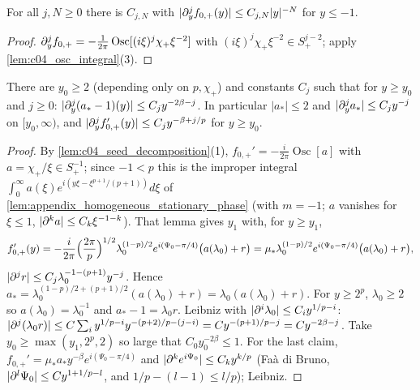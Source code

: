 \begin{lemma}
  \label{lem:c04_f0plus_negative}
  For all $j,N\ge0$ there is $C_{j,N}$ with $|\partial_y^jf_{0,+}(y)|\le C_{j,N}|y|^{-N}$ for $y\le-1$.
\end{lemma}
\begin{proof}
  $\partial^j_yf_{0,+}=-\frac1{2\pi}\operatorname{Osc}[(i\xi)^j\chi_+\xi^{-2}]$ with $(i\xi)^j\chi_+\xi^{-2}\in S^{j-2}_+$; apply
  \cref{lem:c04_osc_integral}(3).
\end{proof}

\begin{lemma}
  \label{lem:c04_seed_amplitude}
  There are $y_0\ge2$ (depending only on $p,\chi_+$) and constants $C_j$ such that for $y\ge y_0$ and $j\ge0$:
  $|\partial_y^j(a_*-1)(y)|\le C_jy^{-2\beta-j}$. In particular $|a_*|\le2$ and $|\partial_y^ja_*|\le C_jy^{-j}$ on $[y_0,\infty)$,
  and $|\partial^j_yf_{0,+}'(y)|\le C_jy^{-\beta+j/p}$ for $y\ge y_0$.
\end{lemma}
\begin{proof}
  By \cref{lem:c04_seed_decomposition}(1), $f_{0,+}'=-\frac i{2\pi}\operatorname{Osc}[a]$ with $a=\chi_+/\xi\in S^{-1}_+$; since $-1<p$ this is the improper
  integral $\int_0^\infty a(\xi)e^{i(y\xi-\xi^{p+1}/(p+1))}d\xi$ of \cref{lem:appendix_homogeneous_stationary_phase} (with $m=-1$; $a$ vanishes for
  $\xi\le1$, $|\partial^ka|\le C_k\xi^{-1-k}$). That lemma gives $y_1$ with, for $y\ge y_1$,
  \[f_{0,+}'(y)=-\frac i{2\pi}\Bigl(\frac{2\pi}p\Bigr)^{1/2}\lambda_0^{(1-p)/2}e^{i(\Psi_0-\pi/4)}\bigl(a(\lambda_0)+r\bigr)
  =\mu_*\lambda_0^{(1-p)/2}e^{i(\Psi_0-\pi/4)}\bigl(a(\lambda_0)+r\bigr),\]
  $|\partial^jr|\le C_j\lambda_0^{-1-(p+1)}y^{-j}$. Hence $a_*=\lambda_0^{(1-p)/2+(p+1)/2}(a(\lambda_0)+r)=\lambda_0(a(\lambda_0)+r)$. For $y\ge2^p$,
  $\lambda_0\ge2$ so $a(\lambda_0)=\lambda_0^{-1}$ and $a_*-1=\lambda_0r$. Leibniz with $|\partial^i\lambda_0|\le C_iy^{1/p-i}$:
  $|\partial^j(\lambda_0r)|\le C\sum_iy^{1/p-i}y^{-(p+2)/p-(j-i)}=Cy^{-(p+1)/p-j}=Cy^{-2\beta-j}$. Take $y_0\ge\max(y_1,2^p,2)$ so large
  that $C_0y_0^{-2\beta}\le1$. For the last claim, $f_{0,+}'=\mu_*a_*y^{-\beta}e^{i(\Psi_0-\pi/4)}$ and
  $|\partial^ke^{i\Psi_0}|\le C_ky^{k/p}$ (Faà di Bruno, $|\partial^l\Psi_0|\le Cy^{1+1/p-l}$, and $1/p-(l-1)\le l/p$); Leibniz.
\end{proof}


